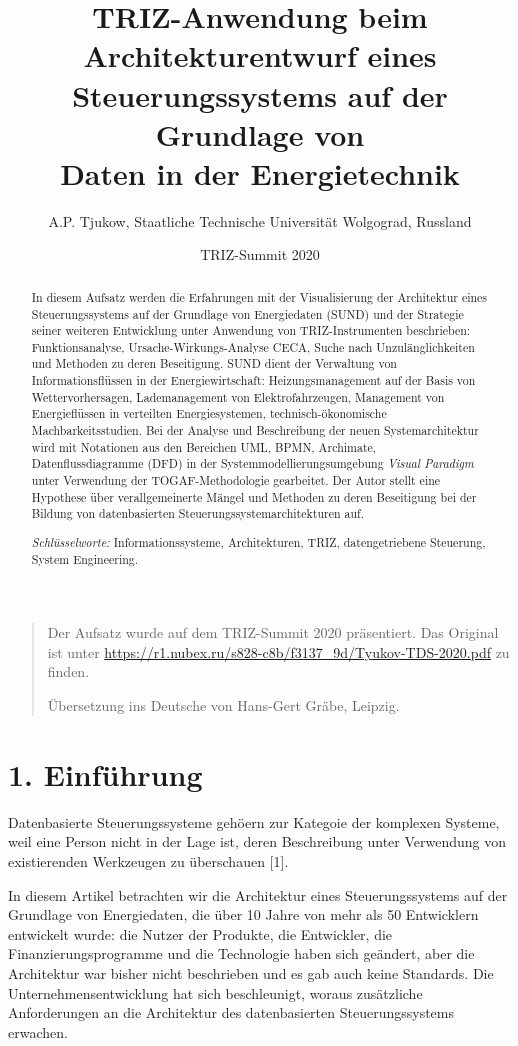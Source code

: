 \documentclass[11pt,a4paper]{article}
\title{TRIZ-Anwendung beim Architekturentwurf eines\\ Steuerungssystems auf
  der Grundlage von\\ Daten in der Energietechnik}
\author{A.P. Tjukow, Staatliche Technische Universität Wolgograd, Russland}
\date{TRIZ-Summit 2020}
\begin{document}
\maketitle

\begin{quote}
  Der Aufsatz wurde auf dem TRIZ-Summit 2020 präsentiert. Das Original ist
  unter
  \url{https://r1.nubex.ru/s828-c8b/f3137_9d/Tyukov-TDS-2020.pdf}
  zu finden.

  Übersetzung ins Deutsche von Hans-Gert Gräbe, Leipzig.
\end{quote}

\begin{abstract}
  In diesem Aufsatz werden die Erfahrungen mit der Visualisierung der
  Architektur eines Steuerungssystems auf der Grundlage von Energiedaten
  (SUND) und der Strategie seiner weiteren Entwicklung unter Anwendung von
  TRIZ-Instrumenten beschrieben: Funktionsanalyse, Ursache-Wirkungs-Analyse
  CECA, Suche nach Unzulänglichkeiten und Methoden zu deren Beseitigung.  SUND
  dient der Verwaltung von Informationsflüssen in der Energiewirtschaft:
  Heizungsmanagement auf der Basis von Wettervorhersagen, Lademanagement von
  Elektrofahrzeugen, Management von Energieflüssen in verteilten
  Energiesystemen, technisch-ökonomische Machbarkeitsstudien. Bei der Analyse
  und Beschreibung der neuen Systemarchitektur wird mit Notationen aus den
  Bereichen UML, BPMN, Archimate, Datenflussdiagramme (DFD) in der
  Systemmodellierungsumgebung \emph{Visual Paradigm} unter Verwendung der
  TOGAF-Methodologie gearbeitet.  Der Autor stellt eine Hypothese über
  verallgemeinerte Mängel und Methoden zu deren Beseitigung bei der Bildung
  von datenbasierten Steuerungssystemarchitekturen auf.

  \emph{Schlüsselworte:} Informationssysteme, Architekturen, TRIZ,
  datengetriebene Steuerung, System Engineering.
\end{abstract}

\section*{1. Einführung}
Datenbasierte Steuerungssysteme gehöern zur Kategoie der komplexen Systeme,
weil eine Person nicht in der Lage ist, deren Beschreibung unter Verwendung
von existierenden Werkzeugen zu überschauen [1].

In diesem Artikel betrachten wir die Architektur eines Steuerungssystems auf
der Grundlage von Energiedaten, die über 10 Jahre von mehr als 50 Entwicklern
entwickelt wurde: die Nutzer der Produkte, die Entwickler, die
Finanzierungsprogramme und die Technologie haben sich geändert, aber die
Architektur war bisher nicht beschrieben und es gab auch keine Standards.  Die
Unternehmensentwicklung hat sich beschleunigt, woraus zusätzliche
Anforderungen an die Architektur des datenbasierten Steuerungssystems
erwachen.
\end{document}
